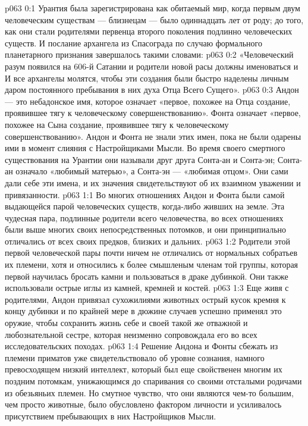 \author{Носитель Жизни}
\vs p063 0:1 Урантия была зарегистрирована как обитаемый мир, когда первым двум человеческим существам --- близнецам --- было одиннадцать лет от роду; до того, как они стали родителями первенца второго поколения подлинно человеческих существ. И послание архангела из Спасограда по случаю формального планетарного признания завершалось такими словами:
\vs p063 0:2 «Человеческий разум появился на 606\hyp{}й Сатании и родители новой расы должны именоваться  и  И все архангелы молятся, чтобы эти создания были быстро наделены личным даром постоянного пребывания в них духа Отца Всего Сущего».
\vs p063 0:3 \pc Андон --- это небадонское имя, которое означает «первое, похожее на Отца создание, проявившее тягу к человеческому совершенствованию». Фонта означает «первое, похожее на Сына создание, проявившее тягу к человеческому совершенствованию». Андон и Фонта не знали этих имен, пока не были одарены ими в момент слияния с Настройщиками Мысли. Во время своего смертного существования на Урантии они называли друг друга Сонта\hyp{}ан и Сонта\hyp{}эн; Сонта\hyp{}ан означало «любимый матерью», а Сонта\hyp{}эн --- «любимая отцом». Они сами дали себе эти имена, и их значения свидетельствуют об их взаимном уважении и привязанности.
\vs p063 1:1 Во многих отношениях Андон и Фонта были самой выдающейся парой человеческих существ, когда\hyp{}либо живших на земле. Эта чудесная пара, подлинные родители всего человечества, во всех отношениях были выше многих своих непосредственных потомков, и они принципиально отличались от всех своих предков, близких и дальних.
\vs p063 1:2 Родители этой первой человеческой пары почти ничем не отличались от нормальных собратьев их племени, хотя и относились к более смышленым членам той группы, которая первой научилась бросать камни и пользоваться в драке дубинкой. Они также использовали острые иглы из камней, кремней и костей.
\vs p063 1:3 Еще живя с родителями, Андон привязал сухожилиями животных острый кусок кремня к концу дубинки и по крайней мере в дюжине случаев успешно применял это оружие, чтобы сохранить жизнь себе и своей такой же отважной и любознательной сестре, которая неизменно сопровождала его во всех исследовательских походах.
\vs p063 1:4 Решение Андона и Фонты сбежать из племени приматов уже свидетельствовало об уровне сознания, намного превосходящем низкий интеллект, который был еще свойственен многим их поздним потомкам, унижающимся до спаривания со своими отсталыми родичами из обезьяньих племен. Но смутное чувство, что они являются чем\hyp{}то большим, чем просто животные, было обусловлено фактором личности и усиливалось присутствием пребывающих в них Настройщиков Мысли.
